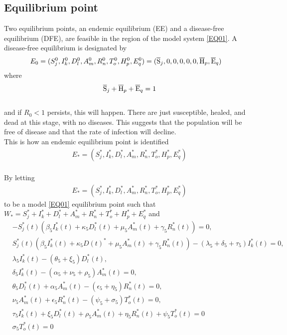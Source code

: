 \documentclass{article}
\begin{document}
\subsection{Equilibrium point}
Two equilibrium points, an endemic equilibrium (EE) and a disease-free equilibrium (DFE), are feasible in the region of the model system \ref{EQ01}. A disease-free equilibrium is designated by\\
\begin{align} \label{DFE:DFE}
    E_0 &= (S_j^0, I_k^0, D_l^0, A_m^0, R_n^0, T_o^0,  H_p^0,  E_q^0) = (\overline{\rm S}_j, 0, 0, 0, 0, 0, \overline{\rm H}_p , \overline{\rm E}_q)
\end{align}
where
\begin{align*}
    \overline{\rm S}_j + \overline{\rm H}_p + \overline{\rm E}_q = 1
\end{align*}\\
and if $R_0<1$ persists, this will happen. There are just susceptible, healed, and dead at this stage, with no diseases. This suggests that the population will be free of disease and that the rate of infection will decline.\\
This is how an endemic equilibrium point is identified\\
\begin{align}
    E_*=(S_j^*, I_k^*, D_l^*, A_m^*, R_n^*, T_o^*, H_p^*, E_q^*)
\end{align}\\
By letting
\begin{align}
    E_*=(S_j^*, I_k^*, D_l^*, A_m^*, R_n^*, T_o^*, H_p^*, E_q^*)
\end{align}
to be a model \ref{EQ01} equilibrium point such that $W_*=S_j^*+ I_k^*+ D_l^*+ A_m^*+ R_n^*+ T_o^*+ H_p^*+ E_q^*$ and\\
\begin{align}
&-S_j^*(t)(\beta_5 I_k^*(t) +\kappa_5 D_l^*(t) +\mu_5 A_m^*(t)+\gamma_5 R_n^*(t)) = 0, \label{DFE:1}\\
&S_j^*(t)(\beta_5 I_k^*(t) +\kappa_5 D(t)^*+\mu_5 A_m^*(t)+\gamma_5 R_n^*(t))
-(\lambda_5 +\delta_5 + \tau_5)I_k^*(t) = 0,\label{DFE:2}\\
&\lambda_5 I_k^*(t) -(\theta_5 + \xi_5)D_l^*(t), \label{DFE:3} \\  
&\delta_5 I_k^*(t) -(\alpha_5 + \nu_5 + \rho_5)A_m^*(t) = 0, \label{DFE:4}\\
&\theta_5 D_l^*(t) + \alpha_5 A_m^*(t) -(\epsilon_5 + \eta_5)R_n^*(t) = 0, \label{DFE:5}\\
&\nu_5 A_m^*(t) +\epsilon_5 R_n^*(t) - (\psi_5 + \sigma_5)T_o^*(t) = 0, \label{DFE:6}\\
&\tau_5 I_k^*(t) + \xi_5 D_l^*(t) + \rho_5 A_m^*(t) + \eta_5 R_n^*(t) + \psi_5 T_o^*(t) = 0 \label{DFE:7}\\
&\sigma_5 T_o^*(t) = 0 \label{DFE:8} 
\end{align}\\
\end{document}
